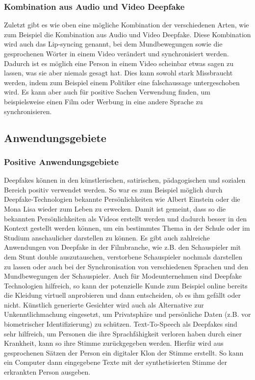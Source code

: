 \subsubsection*{Kombination aus Audio und Video Deepfake}
Zuletzt gibt es wie oben eine mögliche Kombination der verschiedenen Arten, wie zum Beispiel die Kombination aus Audio und Video Deepfake.
Diese Kombination wird auch das Lip-syncing genannt, bei dem Mundbewegungen sowie die gesprochenen Wörter in einem Video verändert und synchronisiert werden.
Dadurch ist es möglich eine Person in einem Video scheinbar etwas sagen zu lassen, was sie aber niemals gesagt hat. Dies kann sowohl stark Missbraucht werden, indem zum Beispiel einem Politiker eine falschaussage untergeschoben wird.
Es kann aber auch für positive Sachen Verwendung finden, um beispielsweise einen Film oder Werbung in eine andere Sprache zu synchronisieren.\cite{ResearchGate}

\subsection{Anwendungsgebiete}
\subsubsection*{Positive Anwendungsgebiete}
Deepfakes können in den künstlerischen, satirischen, pädagogischen und sozialen Bereich positiv verwendet werden.\newline
So war es zum Beispiel möglich durch Deepfake-Technologien bekannte Persönlichkeiten wie Albert Einstein oder die Mona Lisa wieder zum Leben zu erwecken. Damit ist gemeint, dass so die bekannten Persönlichkeiten als Videos erstellt werden und dadurch besser in den Kontext gestellt werden können, um ein bestimmtes Thema in der Schule oder im Studium anschaulicher darstellen zu können.\newline
Es gibt auch zahlreiche Anwendungen von Deepfake in der Filmbranche, wie z.B. den Schauspieler mit dem Stunt double auszutauschen, verstorbene Schauspieler nochmals darstellen zu lassen oder auch bei der Synchronisation von verschiedenen Sprachen und den Mundbewegungen der Schauspieler.
Auch für Modeunternehmen sind Deepfake Technologien hilfreich, so kann der potenzielle Kunde zum Beispiel online bereits die Kleidung virtuell anprobieren und dann entscheiden, ob es ihm gefällt oder nicht.\newline
Künstlich generierte Gesichter wird auch als Alternative zur Unkenntlichmachung eingesetzt, um Privatsphäre und persönliche Daten (z.B. vor biometrischer Identifizierung) zu schützen.\newline
Text-To-Speech als Deepfakes sind sehr hilfreich, um Personen die ihre Sprachfähigkeit verloren haben durch einer Krankheit, kann so ihre Stimme zurückgegeben werden. Hierfür wird aus gesprochenen Sätzen der Person ein digitaler Klon der Stimme erstellt. So kann ein Computer dann eingegebene Texte mit der synthetisierten Stimme der erkrankten Person ausgeben.\cite{SpringerLink}

